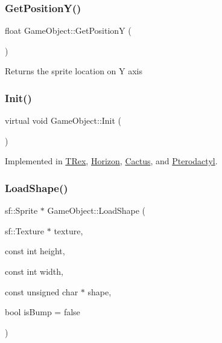 \subsubsection{\texorpdfstring{Get\+Position\+Y()}{GetPositionY()}}
{\footnotesize\ttfamily float Game\+Object\+::\+Get\+PositionY (\begin{DoxyParamCaption}{ }\end{DoxyParamCaption})\hspace{0.3cm}{\ttfamily [inline]}}

Returns the sprite location on Y axis \mbox{\label{class_game_object_ab3b70fcc4e640ba2081508b1efb35536}} 
\subsubsection{\texorpdfstring{Init()}{Init()}}
{\footnotesize\ttfamily virtual void Game\+Object\+::\+Init (\begin{DoxyParamCaption}{ }\end{DoxyParamCaption})\hspace{0.3cm}{\ttfamily [pure virtual]}}



Implemented in \mbox{\hyperlink{class_t_rex_a9975357a104130b3b8f6c5ed65f2eb0e}{T\+Rex}}, \mbox{\hyperlink{class_horizon_a80800c898ea4cd015ae865351a6aec4c}{Horizon}}, \mbox{\hyperlink{class_cactus_af1dc82bd652141aea55d65bde708856a}{Cactus}}, and \mbox{\hyperlink{class_pterodactyl_abb1effe2b67ceabf7494d3f104fc20b5}{Pterodactyl}}.

\mbox{\label{class_game_object_ab570c73233f2e8eb9fb3c043b1a68c4c}} 
\subsubsection{\texorpdfstring{Load\+Shape()}{LoadShape()}}
{\footnotesize\ttfamily sf\+::\+Sprite $\ast$ Game\+Object\+::\+Load\+Shape (\begin{DoxyParamCaption}\item[{sf\+::\+Texture $\ast$}]{texture,  }\item[{const int}]{height,  }\item[{const int}]{width,  }\item[{const unsigned char $\ast$}]{shape,  }\item[{bool}]{is\+Bump = {\ttfamily false} }\end{DoxyParamCaption})\hspace{0.3cm}{\ttfamily [protected]}}



